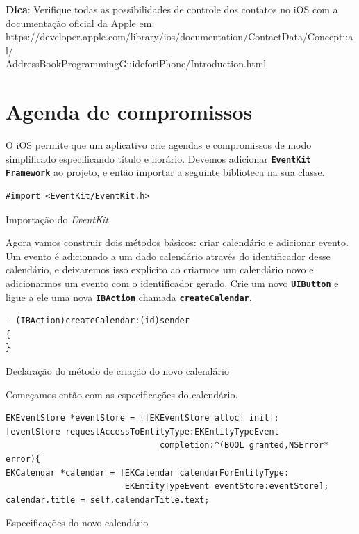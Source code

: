 \documentclass[a4paper,12pt,brazil,doubleside]{book}
\begin{document}
\begin{singlespace}
\begin{framed}

\textbf{Dica}: Verifique todas as possibilidades de controle dos contatos no iOS com a documentação oficial da Apple em:\\ https://developer.apple.com/library/ios/documentation/ContactData/Conceptual/\\AddressBookProgrammingGuideforiPhone/Introduction.html
\end{framed}

\section{Agenda de compromissos}


O iOS permite que um aplicativo crie agendas e compromissos de modo simplificado especificando título e horário. Devemos adicionar \texttt{\textbf{EventKit Framework}} ao projeto, e então importar a seguinte biblioteca na sua classe.

\begin{listing}[H]
\begin{verbatim}
#import <EventKit/EventKit.h>
\end{verbatim}
\caption{Importação do \emph{EventKit}}
\end{listing}

Agora vamos construir dois métodos básicos: criar calendário e adicionar evento. Um evento é adicionado a um dado calendário através do identificador desse calendário, e deixaremos isso explicito ao criarmos um calendário novo e adicionarmos um evento com o identificador gerado. Crie um novo \texttt{\textbf{UIButton}} e ligue a ele uma nova \texttt{\textbf{IBAction}} chamada \texttt{\textbf{createCalendar}}.

\begin{listing}[H]
\begin{verbatim}
- (IBAction)createCalendar:(id)sender
{
}
\end{verbatim}
\caption{Declaração do método de criação do novo calendário}
\end{listing}

Começamos então com as especificações do calendário.

\begin{listing}[H]
\begin{verbatim}
EKEventStore *eventStore = [[EKEventStore alloc] init];
[eventStore requestAccessToEntityType:EKEntityTypeEvent
                               completion:^(BOOL granted,NSError* error){
EKCalendar *calendar = [EKCalendar calendarForEntityType:
						EKEntityTypeEvent eventStore:eventStore];
calendar.title = self.calendarTitle.text;
\end{verbatim}
\caption{Especificações do novo calendário}
\end{listing}


\end{singlespace}
\end{document}
